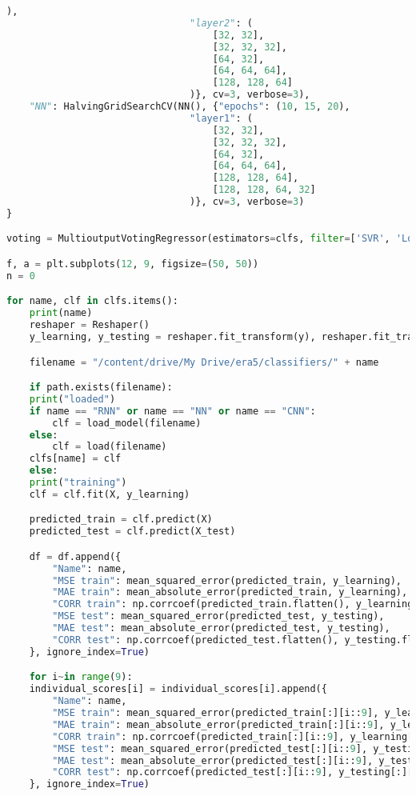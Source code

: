 \begin{lstlisting}[label=python-listing,caption={Kod źródłowy},language=python]
                                ), 
                                "layer2": (
                                    [32, 32],
                                    [32, 32, 32],
                                    [64, 32],
                                    [64, 64, 64],
                                    [128, 128, 64]
                                )}, cv=3, verbose=3),
    "NN": HalvingGridSearchCV(NN(), {"epochs": (10, 15, 20), 
                                "layer1": (
                                    [32, 32],
                                    [32, 32, 32],
                                    [64, 32],
                                    [64, 64, 64],
                                    [128, 128, 64],
                                    [128, 128, 64, 32]
                                )}, cv=3, verbose=3)
}

voting = MultioutputVotingRegressor(estimators=clfs, filter=['SVR', 'Logistic Regression', 'SGD', 'PLS', 'Random Forest', 'MLP', 'RNN', 'CNN', 'NN'])

f, a = plt.subplots(12, 9, figsize=(50, 50))
n = 0

for name, clf in clfs.items():
    print(name)
    reshaper = Reshaper()
    y_learning, y_testing = reshaper.fit_transform(y), reshaper.fit_transform(y_test)

    filename = "/content/drive/My Drive/era5/classifiers/" + name

    if path.exists(filename):
    print("loaded")
    if name == "RNN" or name == "NN" or name == "CNN":
        clf = load_model(filename)
    else:
        clf = load(filename)
    clfs[name] = clf
    else:
    print("training")
    clf = clf.fit(X, y_learning)

    predicted_train = clf.predict(X)
    predicted_test = clf.predict(X_test)

    df = df.append({
        "Name": name,
        "MSE train": mean_squared_error(predicted_train, y_learning),
        "MAE train": mean_absolute_error(predicted_train, y_learning),
        "CORR train": np.corrcoef(predicted_train.flatten(), y_learning.flatten())[0][1],
        "MSE test": mean_squared_error(predicted_test, y_testing),
        "MAE test": mean_absolute_error(predicted_test, y_testing),
        "CORR test": np.corrcoef(predicted_test.flatten(), y_testing.flatten())[0][1]
    }, ignore_index=True)

    for i~in range(9):
    individual_scores[i] = individual_scores[i].append({
        "Name": name,
        "MSE train": mean_squared_error(predicted_train[:][i::9], y_learning[:][i::9]),
        "MAE train": mean_absolute_error(predicted_train[:][i::9], y_learning[:][i::9]),
        "CORR train": np.corrcoef(predicted_train[:][i::9], y_learning[:][i::9]),
        "MSE test": mean_squared_error(predicted_test[:][i::9], y_testing[:][i::9]),
        "MAE test": mean_absolute_error(predicted_test[:][i::9], y_testing[:][i::9]),
        "CORR test": np.corrcoef(predicted_test[:][i::9], y_testing[:][i::9]),
    }, ignore_index=True)


\end{lstlisting}
